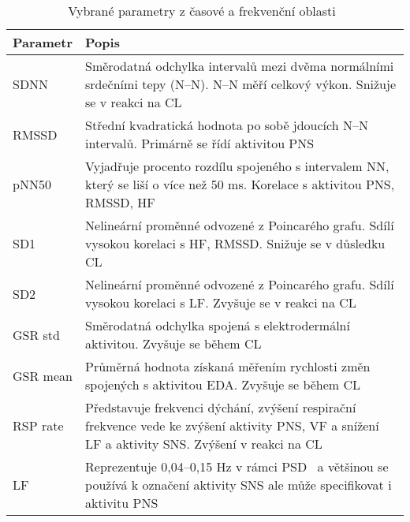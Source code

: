 \begin{table}[!htb]
    \renewcommand{\arraystretch}{1.2}
    \scriptsize
    \centering
    \begin{threeparttable}
        \caption{Vybrané parametry z časové a frekvenční oblasti~\cite{Ishaque2021}}
        \label{tab:hrv_params}
        \begin{tabular}{p{2cm}p{12cm}}
            \toprule
            Parametr & Popis                                                                                                                                                        \\ \midrule
            SDNN     & Směrodatná odchylka intervalů mezi dvěma normálními srdečními tepy (N--N). N--N měří celkový výkon. Snižuje se v reakci na \gls{CL}                              \\
            RMSSD    & Střední kvadratická hodnota po sobě jdoucích N--N intervalů. Primárně se řídí aktivitou \gls{PNS}                                    \\
            pNN50    & Vyjadřuje procento rozdílu spojeného s intervalem NN, který se liší o více než 50 ms. Korelace s aktivitou \gls{PNS}, RMSSD, HF                              \\
            SD1      & Nelineární proměnné odvozené z Poincarého grafu. Sdílí vysokou korelaci s HF, RMSSD. Snižuje se v důsledku \gls{CL}                                          \\
            SD2      & Nelineární proměnné odvozené z Poincarého grafu. Sdílí vysokou korelaci s LF. Zvyšuje se v reakci na \gls{CL}                                                \\
            GSR std  & Směrodatná odchylka spojená s elektrodermální aktivitou. Zvyšuje se během \gls{CL}                                                                           \\
            GSR mean & Průměrná hodnota získaná měřením rychlosti změn spojených s aktivitou EDA. Zvyšuje se během \gls{CL}                                                         \\
            RSP rate & Představuje frekvenci dýchání, zvýšení respirační frekvence vede ke zvýšení aktivity \gls{PNS}, VF a snížení LF a aktivity SNS. Zvýšení v reakci na \gls{CL} \\
            LF       & Reprezentuje 0,04--0,15 Hz v rámci PSD\tnote{1} ~a většinou se používá k označení aktivity \gls{SNS} ale může specifikovat i aktivitu \gls{PNS}              \\

\end{tabular}
\end{threeparttable}
\end{table}
